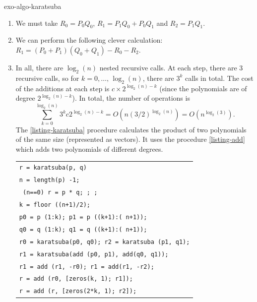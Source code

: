  
\begin{correction}{exo-algo-karatsuba}
\begin{enumerate}
\item We must take $ R_0 = P_0 Q_0 $, $ R_1 = P_1 Q_0 + P_0 Q_1 $ and $ R_2 = P_1 Q_1 $.
\item We can perform the following clever calculation: $ R_1 = (P_0 + P_1) (Q_0 + Q_1) - R_0 - R_2 $.
\item In all, there are $ \log_2 (n) $ nested recursive calls. At each step, there are 3 recursive calls, so for $ k = 0, \ldots, \, \log_2 (n) $, there are $ 3^k $ calls in total. The cost of the additions at each step is $ c \times 2^{\log_2 (n) -k} $ (since the polynomials are of degree $ 2^{\log_2 (n) -k} $). In total, the number of operations is
\begin{equation*}
	\sum_{k = 0}^{\log_2 (n)}{3^kc 2^{\log_2 (n) -k}} = O(n (3/2)^{\log_2 (n)}) = O(n^{\log_2 (3)}).
\end{equation*}
The \Matlab{} \ref{listing-karatsuba} procedure calculates the product of two polynomials of the same size (represented as vectors). It uses the procedure \ref{listing-add} which adds two polynomials of different degrees.

\begin{listing} 
\begin{footnotesize} 
{\upshape
\begin{tabular}{l} \texttt{\pfunction r = karatsuba(p, q)} \\
\texttt{n = length(p) -1;} \\
\texttt{\pif{} (n==0) r = p * q; \preturn{}; \pend{};} \\
\texttt{k = floor ((n+1)/2);} \\
\texttt{p0 = p (1:k); p1 = p ((k+1):( n+1));} \\
\texttt{q0 = q (1:k); q1 = q ((k+1):( n+1));} \\
\texttt{r0 = karatsuba(p0, q0); r2 = karatsuba (p1, q1);} \\
\texttt{r1 = karatsuba(add (p0, p1), add(q0, q1));} \\
\texttt{r1 = add (r1, -r0); r1 = add(r1, -r2);} \\
\texttt{r = add (r0, [zeros(k, 1); r1]);} \\
\texttt{r = add (r, [zeros(2*k, 1); r2]);} \\
\end{tabular}
}
\end{footnotesize}
\caption{Procedure \texttt{\upshape karatsuba}}
\label{listing-karatsuba}
\end{listing}


\end{enumerate}
\end{correction}
